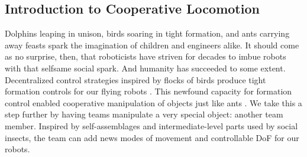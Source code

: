 \documentclass[letterpaper, 10 pt, conference]{ieeeconf}
\begin{document}
\subsection{Introduction to Cooperative Locomotion}
Dolphins leaping in unison, birds soaring in tight formation, and ants carrying away feasts spark the imagination of children and engineers alike.
It should come as no surprise, then, that roboticists have striven for decades to imbue robots with that selfsame social spark.
And humanity has succeeded to some extent.
Decentralized control strategies inspired by flocks of birds \cite{reynolds1987flocks} produce tight formation controls for our flying robots \cite{RealBoids}.
This newfound capacity for formation control enabled cooperative manipulation of objects \cite{rus1995moving,sugar2002control,spletzer2001cooperative,song2002potential} just like ants \cite{kube2000cooperative}.
We take this a step further by having teams manipulate a very special object: another team member.
Inspired by self-assemblages \cite{Anderson2002} and intermediate-level parts \cite{Anderson2001} used by social insects, the team can add news modes of movement and controllable DoF for our robots.
\end{document}
